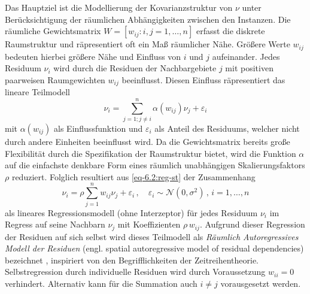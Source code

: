Das Hauptziel ist die Modellierung der Kovarianzstruktur von $\nu$ unter Berücksichtigung der 
räumlichen Abhängigkeiten zwischen den Instanzen.
Die räumliche Gewichtsmatrix $W=[w_{ij}:i,j=1,\ldots,n]$ 
erfasst die diskrete Raumstruktur und räpresentiert oft ein Maß räumlicher Nähe. Größere Werte $w_{ij}$ 
bedeuten hierbei größere Nähe und Einfluss von $i$ und $j$ aufeinander. Jedes Residuum $\nu_{i}$ wird 
durch die Residuen der Nachbargebiete $j$ mit positiven paarweisen Raumgewichten $w_{ij}$ beeinflusst. 
Diesen Einfluss räpresentiert das lineare Teilmodell
\begin{equation} \label{eq-6.2:reg-st}
    \nu_{i}=\sum_{j=1 ; j \neq i}^{n} \alpha(w_{ij}) \nu_{j} + \varepsilon_{i}
\end{equation}   
mit $\alpha(w_{ij})$ als Einflussfunktion und $\varepsilon_{i}$ als Anteil des Residuums, welcher 
nicht durch andere Einheiten beeinflusst wird. Da die Gewichtsmatrix bereits große Flexibilität durch 
die Spezifikation der Raumstruktur bietet, wird die Funktion $\alpha$ auf die einfachste 
denkbare Form eines räumlich unabhängigen Skalierungsfaktors $\rho$ reduziert.
Folglich resultiert aus \eqref{eq-6.2:reg-st} der Zusammenhang
\begin{equation}\label{eq-6.3:reg-err}
    \nu_{i}=\rho \sum_{j = 1}^{n} w_{ij} \nu_{j} + \varepsilon_{i} \, , \quad 
    \varepsilon_{i} \sim \mathcal{N}(0,\sigma^{2}) \, , \, i= 1,\ldots,n
\end{equation}
als lineares Regressionsmodell (ohne Interzeptor) für jedes Residuum $\nu_{i}$ im Regress auf 
seine Nachbarn $\nu_{j}$ mit Koeffizienten $\rho \, w_{ij}$. Aufgrund dieser Regression der 
Residuen auf \glqq sich selbst \grqq{} wird dieses Teilmodell 
als \emph{Räumlich Autoregressives Modell der Residuen} 
(engl. spatial autoregressive model of residual dependencies) 
bezeichnet \cite{whittle_stationary_1954}, inspiriert von den Begrifflichkeiten der Zeitreihentheorie. 
Selbstregression durch individuelle Residuen wird durch Voraussetzung $w_{ii}=0$ verhindert. Alternativ kann für die 
Summation auch $i \neq j$ vorausgesetzt werden.

